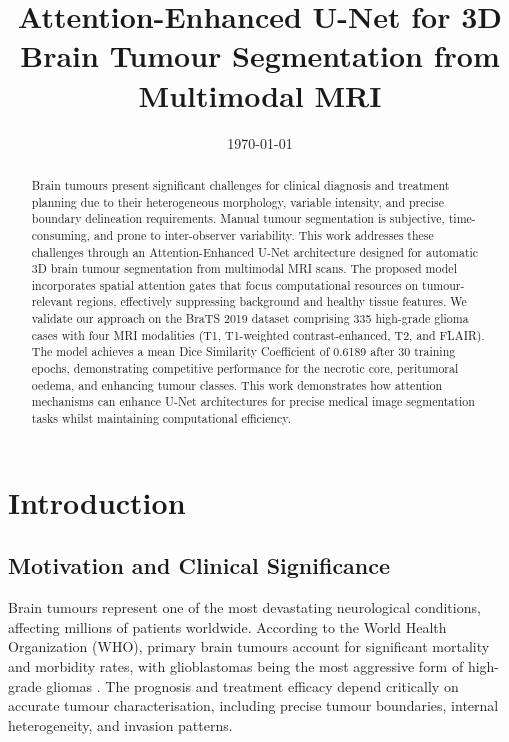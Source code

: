 \documentclass{ecsproject}     %
\begin{document}
\frontmatter
\title      {Attention-Enhanced U-Net for 3D Brain Tumour Segmentation from Multimodal MRI}
\date       {\today}
\maketitle

\begin{abstract}
Brain tumours present significant challenges for clinical diagnosis and treatment planning due to their heterogeneous morphology, variable intensity, and precise boundary delineation requirements. Manual tumour segmentation is subjective, time-consuming, and prone to inter-observer variability. This work addresses these challenges through an Attention-Enhanced U-Net architecture designed for automatic 3D brain tumour segmentation from multimodal MRI scans. The proposed model incorporates spatial attention gates that focus computational resources on tumour-relevant regions, effectively suppressing background and healthy tissue features. We validate our approach on the BraTS 2019 dataset comprising 335 high-grade glioma cases with four MRI modalities (T1, T1-weighted contrast-enhanced, T2, and FLAIR). The model achieves a mean Dice Similarity Coefficient of 0.6189 after 30 training epochs, demonstrating competitive performance for the necrotic core, peritumoral oedema, and enhancing tumour classes. This work demonstrates how attention mechanisms can enhance U-Net architectures for precise medical image segmentation tasks whilst maintaining computational efficiency.
\end{abstract}

\tableofcontents
\listoffigures
\listoftables

\mainmatter

\chapter{Introduction} \label{Chapter:Introduction}

\section{Motivation and Clinical Significance}

Brain tumours represent one of the most devastating neurological conditions, affecting millions of patients worldwide. According to the World Health Organization (WHO), primary brain tumours account for significant mortality and morbidity rates, with glioblastomas being the most aggressive form of high-grade gliomas \cite{Bray2018}. The prognosis and treatment efficacy depend critically on accurate tumour characterisation, including precise tumour boundaries, internal heterogeneity, and invasion patterns.
\end{document}
